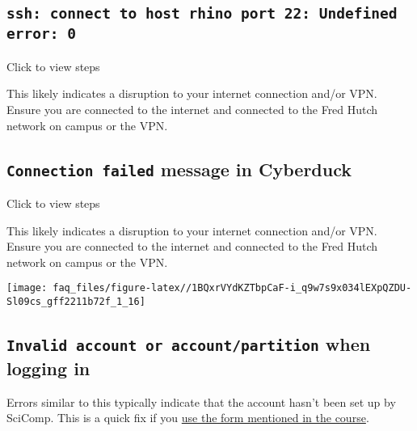 \documentclass[
]{book}
\begin{document}
\hypertarget{ssh-connect-to-host-rhino-port-22-undefined-error-0}{%
\subsection*{\texorpdfstring{\texttt{ssh:\ connect\ to\ host\ rhino\ port\ 22:\ Undefined\ error:\ 0}}{ssh: connect to host rhino port 22: Undefined error: 0}}\label{ssh-connect-to-host-rhino-port-22-undefined-error-0}}

Click to view steps

This likely indicates a disruption to your internet connection and/or VPN. Ensure you are connected to the internet and connected to the Fred Hutch network on campus or the VPN.

\hypertarget{connection-failed-message-in-cyberduck}{%
\subsection*{\texorpdfstring{\texttt{Connection\ failed} message in Cyberduck}{Connection failed message in Cyberduck}}\label{connection-failed-message-in-cyberduck}}

Click to view steps

This likely indicates a disruption to your internet connection and/or VPN. Ensure you are connected to the internet and connected to the Fred Hutch network on campus or the VPN.

\texttt{[image: faq\_files/figure-latex//1BQxrVYdKZTbpCaF-i\_q9w7s9x034lEXpQZDU-Sl09cs\_gff2211b72f\_1\_16]}

\hypertarget{invalid-account-or-accountpartition-when-logging-in}{%
\subsection*{\texorpdfstring{\texttt{Invalid\ account\ or\ account/partition} when logging in}{Invalid account or account/partition when logging in}}\label{invalid-account-or-accountpartition-when-logging-in}}

Errors similar to this typically indicate that the account hasn't been set up by SciComp. This is a quick fix if you \href{account-setup.html\#pi-account}{use the form mentioned in the course}.
\end{document}
